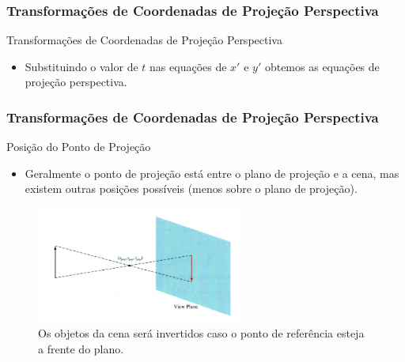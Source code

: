 \documentclass{beamer}
\begin{document}
\begin{frame}
\frametitle{Transformações de Coordenadas de Projeção Perspectiva}
	\begin{block}{Transformações de Coordenadas de Projeção Perspectiva}
		\begin{itemize}
			\item Substituindo o valor de $t$ nas equações de $x'$ e $y'$ obtemos as equações de projeção perspectiva.
		\end{itemize}	
	\end{block}
\end{frame}

\begin{frame}
\frametitle{Transformações de Coordenadas de Projeção Perspectiva}
	\begin{block}{Posição do Ponto de Projeção}
		\begin{itemize}
			\item Geralmente o ponto de projeção está entre o plano de projeção e a cena, mas existem outras posições possíveis (menos sobre o plano de projeção).
		\end{itemize}	
	\end{block}
	
	\begin{figure}[!h]
			\begin{center}
			\includegraphics[width=0.6\textwidth]{Figures/PonProFre}
			\caption{Os objetos da cena será invertidos caso o ponto de referência esteja a frente do plano.}
			\end{center}
	\end{figure}
	
\end{frame}
\end{document}
